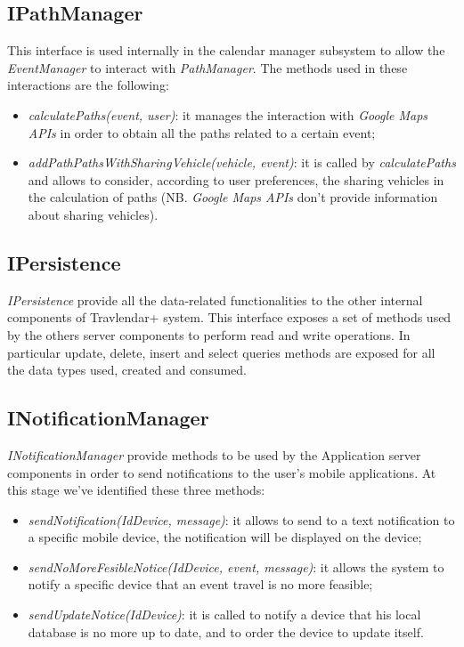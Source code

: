 \subsection{IPathManager}
This interface is used internally in the calendar manager subsystem to allow the \textit{EventManager} to interact with \textit{PathManager}. The methods used in these interactions are the following:
\begin{itemize}
\item \textit{calculatePaths(event, user)}: it manages the interaction with \textit{Google Maps APIs} in order to obtain all the paths related to a certain event;
\item \textit{addPathPathsWithSharingVehicle(vehicle, event)}: it is called by \textit{calculatePaths} and allows to consider, according to user preferences, the sharing vehicles in the calculation of paths (NB. \textit{Google Maps APIs} don't provide information about sharing vehicles). 
\end{itemize}

\subsection{IPersistence}
\label{subsect:IPersistence}
\textit{IPersistence} provide all the data-related functionalities to the other internal components of Travlendar+ system. This interface exposes a set of methods used by the others server components to perform read and write operations. In particular update, delete, insert and select queries methods are exposed for all the data types used, created and consumed.

\subsection{INotificationManager}
\label{subsect:INotificationManager}
\textit{INotificationManager} provide methods to be used by the Application server components in order to send notifications to the user's mobile applications. At this stage we've identified these three methods:
\begin{itemize}
	\item \textit{sendNotification(IdDevice, message)}: it allows to send to a text notification to a specific mobile device, the notification will be displayed on the device;
	\item \textit{sendNoMoreFesibleNotice(IdDevice, event, message)}: it allows the system to notify a specific device that an event travel is no more feasible;
	\item \textit{sendUpdateNotice(IdDevice)}: it is called to notify a device that his local database is no more up to date, and to order the device to update itself.
\end{itemize}

